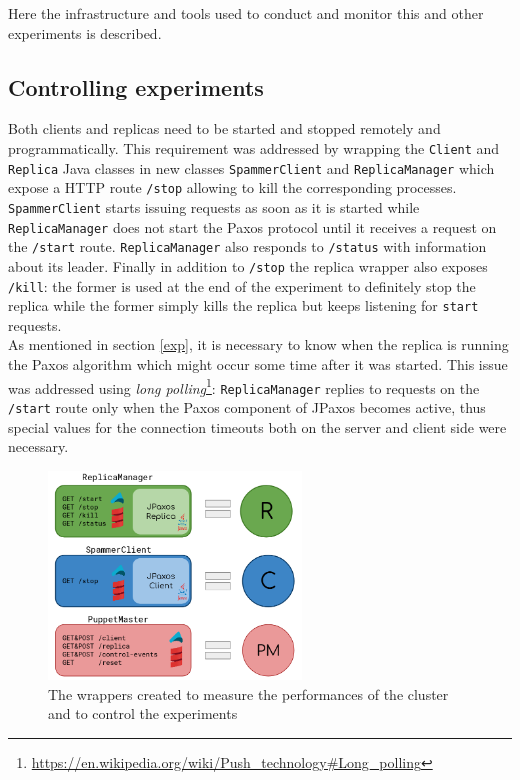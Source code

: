 \documentclass[a4paper, 10pt]{article}
\begin{document}
Here the infrastructure and tools used to conduct and monitor this and other experiments is described.

\subsection{Controlling experiments}
Both clients and replicas need to be started and stopped remotely and programmatically. This requirement was addressed by wrapping the \texttt{Client} and \texttt{Replica} Java classes in new classes \texttt{SpammerClient} and \texttt{ReplicaManager} which expose a HTTP route \texttt{/stop} allowing to kill the corresponding processes. \texttt{SpammerClient} starts issuing requests as soon as it is started while \texttt{ReplicaManager} does not start the Paxos protocol until it receives a request on the \texttt{/start} route. \texttt{ReplicaManager} also responds to \texttt{/status} with information about its leader. Finally in addition to \texttt{/stop} the replica wrapper also exposes \texttt{/kill}: the former is used at the end of the experiment to definitely stop the replica while the former simply kills the replica but keeps listening for \texttt{start} requests.\\
As mentioned in section \ref{exp}, it is necessary to know when the replica is running the Paxos algorithm which might occur some time after it was started. This issue was addressed using \textit{long polling}\footnote{\url{https://en.wikipedia.org/wiki/Push_technology#Long_polling}}: \texttt{ReplicaManager} replies to requests on the \texttt{/start} route only when the Paxos component of JPaxos becomes active, thus special values for the connection timeouts both on the server and client side were necessary.
\begin{figure}[H]
  \centering
  \label{wrappers}
  \caption{The wrappers created to measure the performances of the cluster and to control the experiments}
  \includegraphics[width=0.6\textwidth]{wrappers.png}
\end{figure}
\end{document}
